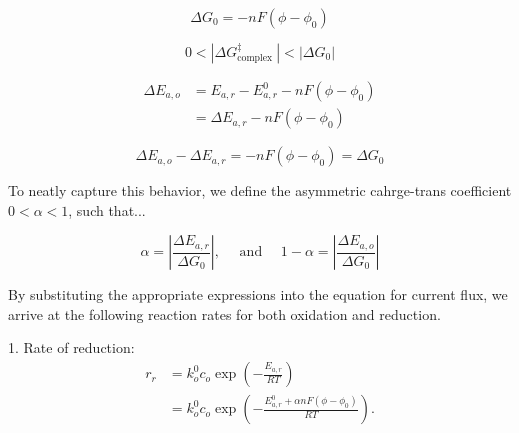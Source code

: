 \documentclass[lettersize,journal]{IEEEtran}
\begin{document}
%

\begin{equation}
\Delta G_{0}=-n F\left(\phi-\phi_{0}\right)
\end{equation}

\begin{equation}
0<\left|\Delta G_{\text {complex }}^{\ddagger}\right|<\left|\Delta G_{0}\right|
\end{equation}

\begin{equation}
\begin{aligned}
\Delta E_{a, o} &=E_{a, r}-E_{a, r}^{0}-n F\left(\phi-\phi_{0}\right) \\
&=\Delta E_{a, r}-n F\left(\phi-\phi_{0}\right)
\end{aligned}
\end{equation}

\begin{equation}
\Delta E_{a, o}-\Delta E_{a, r}=-n F\left(\phi-\phi_{0}\right)=\Delta G_{0}
\end{equation}

\noindent To neatly capture this behavior, we define the asymmetric cahrge-trans coefficient $0 < \alpha < 1$, such that...

\begin{equation}
\alpha=\left|\frac{\Delta E_{a, r}}{\Delta G_{0}}\right|, \quad \text { and } \quad 1-\alpha=\left|\frac{\Delta E_{a, o}}{\Delta G_{0}}\right|
\end{equation}


\noindent By substituting the appropriate expressions into the equation for current flux, we arrive at the following reaction rates for both oxidation and reduction.

1. Rate of reduction:
\begin{equation}
  \begin{aligned}
  r_{r} &=k_{o}^{0} c_{o} \exp \left(-\frac{E_{a, r}}{R T}\right) \\
  &=k_{o}^{0} c_{o} \exp \left(-\frac{E_{a, r}^{0}+\alpha n F\left(\phi-\phi_{0}\right)}{R T}\right) .
  \end{aligned}
\end{equation}
\end{document}
